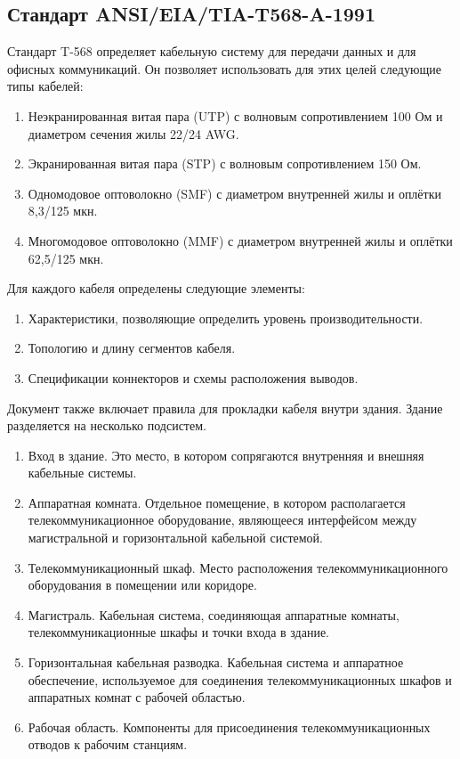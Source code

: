 \documentclass[12pt, russian, oneside, article]{ncc}
\begin{document}
\subsection{Стандарт ANSI/EIA/TIA-T568-A-1991}
\label{sec-4_2}


Стандарт T-568 определяет кабельную систему для передачи данных и для офисных коммуникаций. Он позволяет использовать для этих целей следующие типы кабелей:
\begin{enumerate}
\item Неэкранированная витая пара (UTP) с волновым сопротивлением 100 Ом и диаметром сечения жилы 22/24 AWG.
\item Экранированная витая пара (STP) с волновым сопротивлением 150 Ом.
\item Одномодовое оптоволокно (SMF) с диаметром внутренней жилы и оплётки 8,3/125 мкн.
\item Многомодовое оптоволокно (MMF) с диаметром внутренней жилы и оплётки 62,5/125 мкн.
\end{enumerate}

Для каждого кабеля определены следующие элементы:
\begin{enumerate}
\item Характеристики, позволяющие определить уровень производительности.
\item Топологию и длину сегментов кабеля.
\item Спецификации коннекторов и схемы расположения выводов.
\end{enumerate}

Документ также включает правила для прокладки кабеля внутри здания. Здание разделяется на несколько подсистем.
\begin{enumerate}
\item Вход в здание. Это место, в котором сопрягаются внутренняя и внешняя кабельные системы.
\item Аппаратная комната. Отдельное помещение, в котором располагается телекоммуникационное оборудование, являющееся интерфейсом между магистральной и горизонтальной кабельной системой.
\item Телекоммуникационный шкаф. Место расположения телекоммуникационного оборудования в помещении или коридоре.
\item Магистраль. Кабельная система, соединяющая аппаратные комнаты, телекоммуникационные шкафы и точки входа в здание.
\item Горизонтальная кабельная разводка. Кабельная система и аппаратное обеспечение, используемое для соединения телекоммуникационных шкафов и аппаратных комнат с рабочей областью.
\item Рабочая область. Компоненты для присоединения телекоммуникационных отводов к рабочим станциям.
\end{enumerate}
\end{document}
